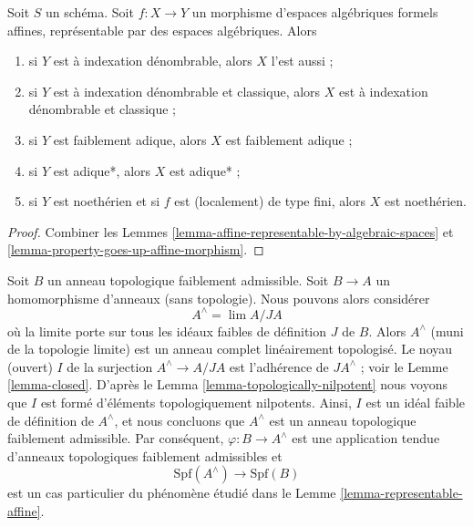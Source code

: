 \begin{lemma}
\label{lemma-property-goes-up-affine}
Soit $S$ un schéma. Soit $f : X \to Y$ un morphisme d'espaces algébriques
formels affines, représentable par des espaces algébriques. Alors
\begin{enumerate}
\item si $Y$ est à indexation dénombrable, alors $X$ l'est aussi ;
\item si $Y$ est à indexation dénombrable et classique, alors $X$ est à indexation
dénombrable et classique ;
\item si $Y$ est faiblement adique, alors $X$ est faiblement adique ;
\item si $Y$ est adique*, alors $X$ est adique* ;
\item si $Y$ est noethérien et si $f$ est (localement) de type fini, alors
$X$ est noethérien.
\end{enumerate}
\end{lemma}

\begin{proof}
Combiner les Lemmes \ref{lemma-affine-representable-by-algebraic-spaces} et
\ref{lemma-property-goes-up-affine-morphism}.
\end{proof}

\begin{example}
\label{example-representable-morphism-from-completion}
Soit $B$ un anneau topologique faiblement admissible. Soit $B \to A$
un homomorphisme d'anneaux (sans topologie). Nous pouvons alors considérer
$$
A^\wedge = \lim A/JA
$$
où la limite porte sur tous les idéaux faibles de définition $J$ de $B$.
Alors $A^\wedge$ (muni de la topologie limite) est un anneau
complet linéairement topologisé. Le noyau (ouvert) $I$
de la surjection $A^\wedge \to A/JA$ est l'adhérence de $JA^\wedge$ ; voir le
Lemme \ref{lemma-closed}. D'après le
Lemma \ref{lemma-topologically-nilpotent}
nous voyons que $I$ est formé d'éléments topologiquement nilpotents.
Ainsi, $I$ est un idéal faible de définition de $A^\wedge$, et nous concluons que
$A^\wedge$ est un anneau topologique faiblement admissible. Par conséquent,
$\varphi : B \to A^\wedge$ est une application tendue d'anneaux topologiques
faiblement admissibles et
$$
\text{Spf}(A^\wedge) \longrightarrow \text{Spf}(B)
$$
est un cas particulier du phénomène étudié dans le
Lemme \ref{lemma-representable-affine}.
\end{example}

